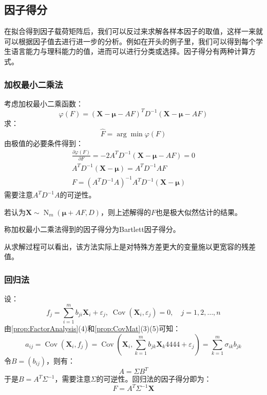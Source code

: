 \subsection{因子得分}
在拟合得到因子载荷矩阵后，我们可以反过来求解各样本因子的取值，这样一来就可以根据因子值去进行进一步的分析。例如在开头的例子里，我们可以得到每个学生语言能力与理科能力的值，进而可以进行分类或选择。因子得分有两种计算方式。
\subsubsection{加权最小二乘法}
\begin{derivation}
	考虑加权最小二乘函数：
	\begin{equation*}
		\varphi(F)=(\mathbf{X}-\boldsymbol{\mu}-AF)^TD^{-1}(\mathbf{X}-\boldsymbol{\mu}-AF)
	\end{equation*}
	求：
	\begin{equation*}
		\hat{F}=\arg\min\varphi(F)
	\end{equation*}
	由极值的必要条件得到：
	\begin{gather*}
		\frac{\partial\varphi(F)}{\partial F}=-2A^TD^{-1}(\mathbf{X}-\boldsymbol{\mu}-AF)=0 \\
		A^TD^{-1}(\mathbf{X}-\boldsymbol{\mu})=A^TD^{-1}AF \\
		F=(A^TD^{-1}A)^{-1}A^TD^{-1}(\mathbf{X}-\boldsymbol{\mu})
	\end{gather*}
	需要注意$A^TD^{-1}A$的可逆性。\par
	若认为$\mathbf{X}\sim\operatorname{N}_m(\boldsymbol{\mu}+AF,D)$，则上述解得的$F$也是极大似然估计的结果。
\end{derivation}
\begin{definition}
	称加权最小二乘法得到的因子得分为Bartlett因子得分。
\end{definition}
从求解过程可以看出，该方法实际上是对特殊方差更大的变量施以更宽容的残差值。

\subsubsection{回归法}
\begin{derivation}
	设：
	\begin{equation*}
		f_j=\sum_{i=1}^{m}b_{ji}\mathbf{X}_i+\varepsilon_j,\;\operatorname{Cov}(\mathbf{X}_i,\varepsilon_j)=0,\quad j=1,2,\dots,n
	\end{equation*}
	由\cref{prop:FactorAnalysis}(4)和\cref{prop:CovMat}(3)(5)可知：
	\begin{equation*}
		a_{ij}=\operatorname{Cov}(\mathbf{X}_i,f_j)=\operatorname{Cov}\left(\mathbf{X}_i,\sum_{k=1}^{m}b_{jk}\mathbf{X}_k4444+\varepsilon_j\right)=\sum_{k=1}^{m}\sigma_{ik}b_{jk}
	\end{equation*}
	令$B=(b_{ij})$，则有：
	\begin{equation*}
		A=\Sigma B^T
	\end{equation*}
	于是$B=A^T\Sigma^{-1}$，需要注意$\Sigma$的可逆性。回归法的因子得分即为：
	\begin{equation*}
		F=A^T\Sigma^{-1}\mathbf{X}
	\end{equation*}
\end{derivation}